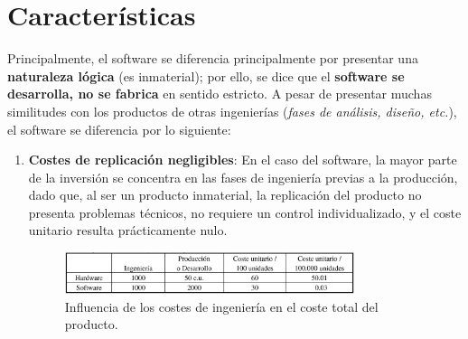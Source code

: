 \section{Características}
Principalmente, el software se diferencia principalmente por presentar una \textbf{naturaleza lógica} (es inmaterial); por ello, se dice que el \textbf{software se desarrolla, no se fabrica} en sentido estricto. A pesar de presentar muchas similitudes con los productos de otras ingenierías (\textit{fases de análisis, diseño, etc.}), el software se diferencia por lo siguiente:
\begin{enumerate}

    \item \textbf{Costes de replicación negligibles}:
          En el caso del software, la mayor parte de la inversión se concentra en las fases de ingeniería previas a la producción, dado que, al ser un producto inmaterial, la replicación del producto no presenta problemas técnicos, no requiere un control individualizado, y el coste unitario resulta prácticamente nulo.
          \begin{figure}[h]
            \centering
            \includegraphics[width=0.8\textwidth]{Resources/Tema1/CostesProduccion.png}
            \caption{Influencia de los costes de ingeniería en el coste total del producto.}
        \end{figure}
          

\end{enumerate}
